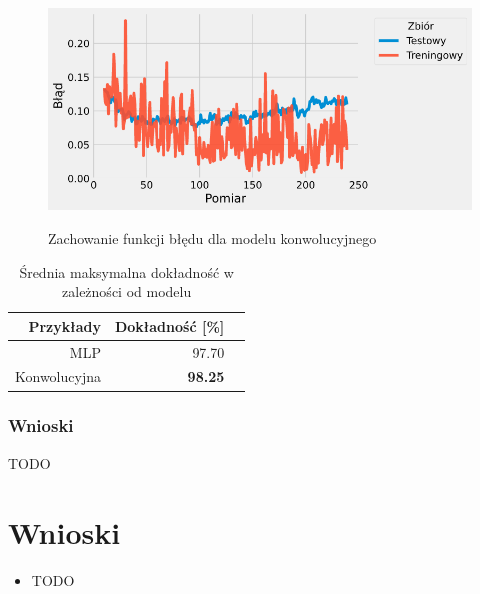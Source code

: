 \documentclass{article}
\begin{document}
\begin{figure}[H]
	\centering
	\caption{Zachowanie funkcji błędu dla modelu konwolucyjnego}
	\includegraphics[width=\textwidth]{con_err.png}
	\label{fig:res24}
\end{figure}

\begin{table}[H]
	\caption{Średnia maksymalna dokładność w zależności od modelu}
	\label{tabela-res-21}
	\centering
	\begin{tabular}{rrr}
		\toprule
		Przykłady   & Dokładność [\%] \\
		\midrule
		MLP          & 97.70              \\
		Konwolucyjna & \textbf{98.25}     \\
		\bottomrule
	\end{tabular}
\end{table}

\subsubsection*{Wnioski}

TODO

\newpage
\section{Wnioski}

\begin{itemize}
	\item TODO
\end{itemize}
\end{document}
